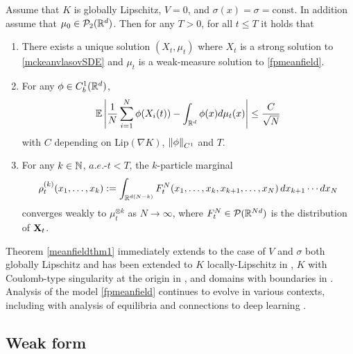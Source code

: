 \documentclass[english,reqno]{amsart}
\begin{document}
\begin{thm}\label{meanfieldthm1} 
Assume that $K$ is globally Lipschitz, $V=0$, and $\sigma(x)=\sigma=\text{const.}$ In addition assume that $\mu_0\in {\mathcal{P}}_2(\mathbb{R}^d)$. Then for any $T>0$, for all $t\leq T$ it holds that
\begin{enumerate}[label=(\roman*)]
\item There exists a unique solution $(X_t, \mu_t)$ where $X_t$ is a strong solution to \eqref{mckeanvlasovSDE} and $\mu_t$ is a weak-measure solution to \eqref{fpmeanfield}. 
\item For any $\phi\in C^1_b(\mathbb{R}^d)$,
\begin{equation}\label{propchaos}
\mathbb{E}\left\vert \frac{1}{N}\sum_{i=1}^N \phi(X_i(t))-\int_{\mathbb{R}^d}\phi(x)d\mu_t(x)\right\vert\leq \frac{C}{\sqrt{N}}
\end{equation}
with $C$ depending on $\text{Lip}(\nabla K)$, $\left\Vert {\phi} \right\Vert_{C^1}$ and $T$.
\item For any $k\in \mathbb{N}$, $a.e.$-$t< T$, the $k$-particle marginal
\[\rho_t^{(k)}(x_1,\dots,x_k):=\int_{\mathbb{R}^{d(N-k)}} F_t^N(x_1,\dots,x_k,x_{k+1},\dots,x_N)\,dx_{k+1}\cdots dx_N\]
converges weakly to $\mu_t^{\otimes k}$ as $N\to \infty$, where $F^N_t\in{\mathcal{P}}(\mathbb{R}^{Nd})$ is the distribution of $\mathbf{X}_t$.
\end{enumerate}
\end{thm}

Theorem \ref{meanfieldthm1} immediately extends to the case of $V$ and $\sigma$ both globally Lipschitz and has been extended to $K$ locally-Lipschitz in \cite{bolley2011stochastic}, $K$ with Coulomb-type singularity at the origin in \cite{boers2016mean}, and domains with boundaries in \cite{fetecau2019propagation,fetecau2018zero}. Analysis of the model \eqref{fpmeanfield} continues to evolve in various contexts, including with analysis of equilibria \cite{messenger2020equilibria,fetecau2017swarm,carrillo2019existence} and connections to deep learning \cite{araujo2019mean}.

\subsection{Weak form}
\end{document}
